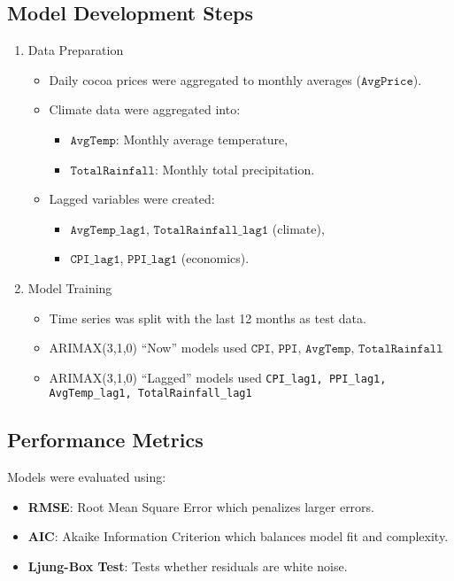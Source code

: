 \subsection{Model Development Steps}
\begin{enumerate}
\item{Data Preparation}
\begin{itemize}
    \item Daily cocoa prices were aggregated to monthly averages ($\texttt{AvgPrice}$).
    \item Climate data were aggregated into:
        \begin{itemize}
            \item $\texttt{AvgTemp}$: Monthly average temperature,
            \item $\texttt{TotalRainfall}$: Monthly total precipitation.
        \end{itemize}
    \item Lagged variables were created:
        \begin{itemize}
            \item $\texttt{AvgTemp\_lag1}$, $\texttt{TotalRainfall\_lag1}$ (climate),
            \item $\texttt{CPI\_lag1}$, $\texttt{PPI\_lag1}$ (economics).
        \end{itemize}
\end{itemize}

\item{Model Training}
\begin{itemize}
    \item Time series was split with the last 12 months as test data.
    \item ARIMAX(3,1,0) ``Now'' models used $\texttt{CPI, PPI, AvgTemp, TotalRainfall}$
    \item ARIMAX(3,1,0) ``Lagged'' models used \texttt{CPI\_lag1, PPI\_lag1, AvgTemp\_lag1, TotalRainfall\_lag1}

\end{itemize}
\end{enumerate}

\subsection{Performance Metrics}

Models were evaluated using:
\begin{itemize}
    \item \textbf{RMSE}: Root Mean Square Error which penalizes larger errors.
    \item \textbf{AIC}: Akaike Information Criterion which balances model fit and complexity.
    \item \textbf{Ljung-Box Test}: Tests whether residuals are white noise.
\end{itemize}

